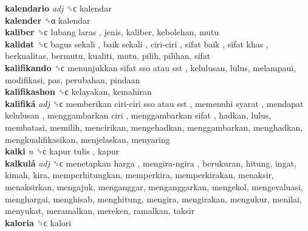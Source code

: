 \textbf{kalendario} \emph{adj}  ␝ϲ  kalendar  \\
\textbf{kalender} ␝α  kalendar  \\
\textbf{kaliber} ␝ϲ   lubang laras , jenis, kaliber, kebolehan, mutu  \\
\textbf{kalidat} ␝ϲ   bagus sekali ,  baik sekali ,  ciri-ciri ,  sifat baik ,  sifat khas , berkualitas, bermutu, kualiti, mutu, pilih, pilihan, sifat  \\
\textbf{kalifikando} ␝ϲ   menunjukkan sifat sso atau sst , kelulusan, lulus, melampaui, modifikasi, pas, perubahan, pindaan  \\
\textbf{kalifikashon} ␝ϲ  kelayakan, kemahiran  \\
\textbf{kalifiká} \emph{adj}  ␝ϲ   memberikan ciri-ciri sso atau sst ,  memenuhi syarat ,  mendapat kelulusan ,  menggambarkan ciri ,  menggambarkan sifat , hadkan, lulus, membatasi, memilih, mencirikan, mengehadkan, menggambarkan, menghadkan, mengkualifikasikan, menjelaskan, menyaring  \\
\textbf{kalki} \emph{n}  ␝ϲ   kapur tulis , kapur  \\
\textbf{kalkulá} \emph{adj}  ␝ϲ   menetapkan harga ,  mengira-ngira , berukuran, hitung, ingat, kimah, kira, memperhitungkan, memperkira, memperkirakan, menaksir, menaksirkan, mengajuk, menganggar, menganggarkan, mengekol, mengevaluasi, menghargai, menghisab, menghitung, mengira, mengirakan, mengukur, menilai, menyukat, meramalkan, mereken, ramalkan, taksir  \\
\textbf{kaloria} ␝ϲ  kalori  \\
